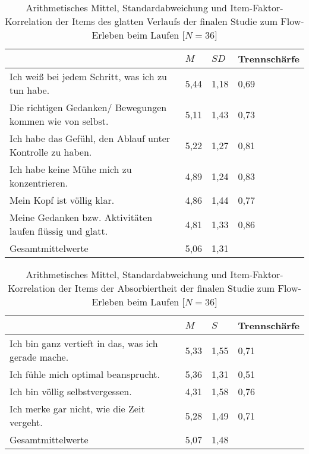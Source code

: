 \begin{table}[ht]
\centering
	\caption[Item-Faktor-Korrelation der Items des glatten Verlaufs (Studie: Laufen)]{Arithmetisches Mittel, Standardabweichung und Item-Faktor-Korrelation der Items des glatten Verlaufs der finalen Studie zum Flow-Erleben beim Laufen [$N = 36$]}
	\label{tab:glatter_verlauf_studie_laufen}
	\begin{tabularx}{\textwidth}{p{} p{} p{} p{}}
\toprule
& $M$ & $SD$ & Trennschärfe \\
\midrule
Ich weiß bei jedem Schritt, was ich zu tun habe. & 5,44 & 1,18 & 0,69 \\
Die richtigen Gedanken/ Bewegungen kommen wie von selbst. & 5,11 & 1,43 & 0,73 \\
Ich habe das Gefühl, den Ablauf unter Kontrolle zu haben. & 5,22 & 1,27 & 0,81 \\
Ich habe keine Mühe mich zu konzentrieren. & 4,89 & 1,24 & 0,83 \\
Mein Kopf ist völlig klar. & 4,86 & 1,44 & 0,77 \\
Meine Gedanken bzw. Aktivitäten laufen flüssig und glatt. & 4,81 & 1,33 & 0,86 \\
Gesamtmittelwerte & 5,06 & 1,31 & \\
\bottomrule
\end{tabularx}
\end{table}

\begin{table}[ht]
\centering
	\caption[Item-Faktor-Korrelation der Items der Absorbiertheit (Studie: Laufen)]{Arithmetisches Mittel, Standardabweichung und Item-Faktor-Korrelation der Items der Absorbiertheit der finalen Studie zum Flow-Erleben beim Laufen [$N = 36$]}
	\label{tab:absorbiertheit_studie_laufen}
	\begin{tabularx}{\textwidth}{p{} p{} p{} p{}}
\toprule
& $M$ & $S$ & Trennschärfe \\
\midrule
Ich bin ganz vertieft in das, was ich gerade mache. & 5,33 & 1,55 & 0,71 \\
Ich fühle mich optimal beansprucht. & 5,36 & 1,31 & 0,51 \\
Ich bin völlig selbstvergessen. & 4,31 & 1,58 & 0,76 \\
Ich merke gar nicht, wie die Zeit vergeht. & 5,28 & 1,49 & 0,71 \\
Gesamtmittelwerte & 5,07 & 1,48 & \\
\bottomrule
\end{tabularx}
\end{table}

